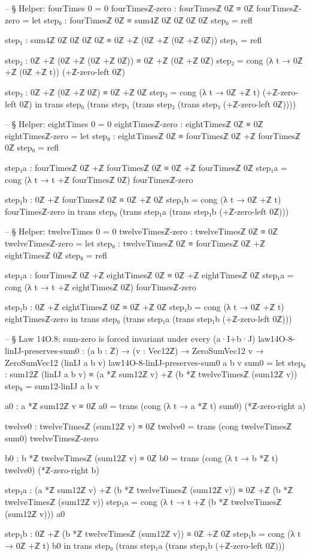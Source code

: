 \documentclass[11pt,a4paper]{book}
\begin{document}
\begin{code}
-- § Helper: fourTimes 0 = 0
fourTimesℤ-zero : fourTimesℤ 0ℤ ≡ 0ℤ
fourTimesℤ-zero =
  let
    step₀ : fourTimesℤ 0ℤ ≡ sum4ℤ 0ℤ 0ℤ 0ℤ 0ℤ
    step₀ = refl

    step₁ : sum4ℤ 0ℤ 0ℤ 0ℤ 0ℤ ≡ 0ℤ +ℤ (0ℤ +ℤ (0ℤ +ℤ 0ℤ))
    step₁ = refl

    step₂ : 0ℤ +ℤ (0ℤ +ℤ (0ℤ +ℤ 0ℤ)) ≡ 0ℤ +ℤ (0ℤ +ℤ 0ℤ)
    step₂ = cong (λ t → 0ℤ +ℤ (0ℤ +ℤ t)) (+ℤ-zero-left 0ℤ)

    step₃ : 0ℤ +ℤ (0ℤ +ℤ 0ℤ) ≡ 0ℤ +ℤ 0ℤ
    step₃ = cong (λ t → 0ℤ +ℤ t) (+ℤ-zero-left 0ℤ)
  in
  trans step₀ (trans step₁ (trans step₂ (trans step₃ (+ℤ-zero-left 0ℤ))))

-- § Helper: eightTimes 0 = 0
eightTimesℤ-zero : eightTimesℤ 0ℤ ≡ 0ℤ
eightTimesℤ-zero =
  let
    step₀ : eightTimesℤ 0ℤ ≡ fourTimesℤ 0ℤ +ℤ fourTimesℤ 0ℤ
    step₀ = refl

    step₁a : fourTimesℤ 0ℤ +ℤ fourTimesℤ 0ℤ ≡ 0ℤ +ℤ fourTimesℤ 0ℤ
    step₁a = cong (λ t → t +ℤ fourTimesℤ 0ℤ) fourTimesℤ-zero

    step₁b : 0ℤ +ℤ fourTimesℤ 0ℤ ≡ 0ℤ +ℤ 0ℤ
    step₁b = cong (λ t → 0ℤ +ℤ t) fourTimesℤ-zero
  in
  trans step₀ (trans step₁a (trans step₁b (+ℤ-zero-left 0ℤ)))

-- § Helper: twelveTimes 0 = 0
twelveTimesℤ-zero : twelveTimesℤ 0ℤ ≡ 0ℤ
twelveTimesℤ-zero =
  let
    step₀ : twelveTimesℤ 0ℤ ≡ fourTimesℤ 0ℤ +ℤ eightTimesℤ 0ℤ
    step₀ = refl

    step₁a : fourTimesℤ 0ℤ +ℤ eightTimesℤ 0ℤ ≡ 0ℤ +ℤ eightTimesℤ 0ℤ
    step₁a = cong (λ t → t +ℤ eightTimesℤ 0ℤ) fourTimesℤ-zero

    step₁b : 0ℤ +ℤ eightTimesℤ 0ℤ ≡ 0ℤ +ℤ 0ℤ
    step₁b = cong (λ t → 0ℤ +ℤ t) eightTimesℤ-zero
  in
  trans step₀ (trans step₁a (trans step₁b (+ℤ-zero-left 0ℤ)))

-- § Law 14O.8: sum-zero is forced invariant under every (a·I+b·J)
law14O-8-linIJ-preserves-sum0 : (a b : ℤ) → (v : Vec12ℤ) → ZeroSumVec12 v → ZeroSumVec12 (linIJ a b v)
law14O-8-linIJ-preserves-sum0 a b v sum0 =
  let
    step₀ : sum12ℤ (linIJ a b v)
      ≡ (a *ℤ sum12ℤ v) +ℤ (b *ℤ twelveTimesℤ (sum12ℤ v))
    step₀ = sum12-linIJ a b v

    a0 : a *ℤ sum12ℤ v ≡ 0ℤ
    a0 = trans (cong (λ t → a *ℤ t) sum0) (*ℤ-zero-right a)

    twelve0 : twelveTimesℤ (sum12ℤ v) ≡ 0ℤ
    twelve0 = trans (cong twelveTimesℤ sum0) twelveTimesℤ-zero

    b0 : b *ℤ twelveTimesℤ (sum12ℤ v) ≡ 0ℤ
    b0 = trans (cong (λ t → b *ℤ t) twelve0) (*ℤ-zero-right b)

    step₁a : (a *ℤ sum12ℤ v) +ℤ (b *ℤ twelveTimesℤ (sum12ℤ v))
          ≡ 0ℤ +ℤ (b *ℤ twelveTimesℤ (sum12ℤ v))
    step₁a = cong (λ t → t +ℤ (b *ℤ twelveTimesℤ (sum12ℤ v))) a0

    step₁b : 0ℤ +ℤ (b *ℤ twelveTimesℤ (sum12ℤ v)) ≡ 0ℤ +ℤ 0ℤ
    step₁b = cong (λ t → 0ℤ +ℤ t) b0
  in
  trans step₀ (trans step₁a (trans step₁b (+ℤ-zero-left 0ℤ)))
\end{code}
\end{document}
